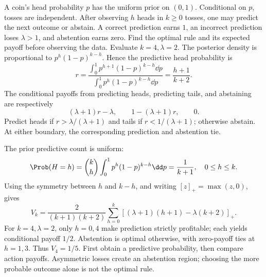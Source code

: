 A coin's head probability $p$ has the uniform prior on $(0,1)$. Conditional on $p$, tosses are independent. After observing $h$ heads in $k\ge0$ tosses, one may predict the next outcome or abstain. A correct prediction earns $1$, an incorrect prediction loses $\lambda>1$, and abstention earns zero. Find the optimal rule and its expected payoff before observing the data. Evaluate $k=4,\lambda=2$.
\solution The posterior density is proportional to $p^h(1-p)^{k-h}$. Hence the predictive head probability is
\[
r=\frac{\int_0^1p^{h+1}(1-p)^{k-h}\dd p}
{\int_0^1p^h(1-p)^{k-h}\dd p}
=\frac{h+1}{k+2}.
\]
The conditional payoffs from predicting heads, predicting tails, and abstaining are respectively
\[
(\lambda+1)r-\lambda,\qquad 1-(\lambda+1)r,\qquad0.
\]
Predict heads if $r>\lambda/(\lambda+1)$ and tails if $r<1/(\lambda+1)$; otherwise abstain. At either boundary, the corresponding prediction and abstention tie.

The prior predictive count is uniform:
\[
\Prob(H=h)=\binom kh\int_0^1p^h(1-p)^{k-h}\dd p
=\frac1{k+1},\quad 0\le h\le k.
\]
Using the symmetry between $h$ and $k-h$, and writing $[z]_+=\max(z,0)$, gives
\[
\boxed{V_k=\frac{2}{(k+1)(k+2)}
\sum_{h=0}^k[(\lambda+1)(h+1)-\lambda(k+2)]_+.}
\]
For $k=4,\lambda=2$, only $h=0,4$ make prediction strictly profitable; each yields conditional payoff $1/2$. Abstention is optimal otherwise, with zero-payoff ties at $h=1,3$. Thus $V_4=1/5$.
\insight First obtain a predictive probability, then compare action payoffs. Asymmetric losses create an abstention region; choosing the more probable outcome alone is not the optimal rule.
